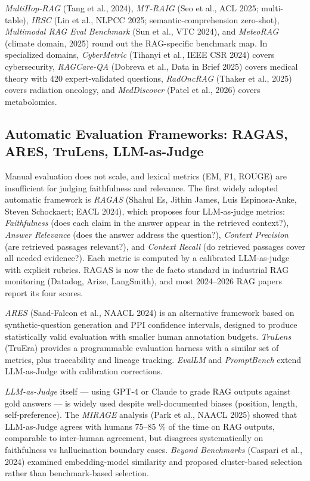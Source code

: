\emph{MultiHop-RAG} (Tang et al., 2024), \emph{MT-RAIG} (Seo et al., ACL 2025; multi-table), \emph{IRSC} (Lin et al., NLPCC 2025; semantic-comprehension zero-shot), \emph{Multimodal RAG Eval Benchmark} (Sun et al., VTC 2024), and \emph{MeteoRAG} (climate domain, 2025) round out the RAG-specific benchmark map. In specialized domains, \emph{CyberMetric} (Tihanyi et al., IEEE CSR 2024) covers cybersecurity, \emph{RAGCare-QA} (Dobreva et al., Data in Brief 2025) covers medical theory with 420 expert-validated questions, \emph{RadOncRAG} (Thaker et al., 2025) covers radiation oncology, and \emph{MedDiscover} (Patel et al., 2026) covers metabolomics.

\subsection{Automatic Evaluation Frameworks: RAGAS, ARES, TruLens, LLM-as-Judge}\label{automatic-evaluation-frameworks-ragas-ares-trulens-llm-as-judge}

Manual evaluation does not scale, and lexical metrics (EM, F1, ROUGE) are insufficient for judging faithfulness and relevance. The first widely adopted automatic framework is \emph{RAGAS} (Shahul Es, Jithin James, Luis Espinosa-Anke, Steven Schockaert; EACL 2024), which proposes four LLM-as-judge metrics: \emph{Faithfulness} (does each claim in the answer appear in the retrieved context?), \emph{Answer Relevance} (does the answer address the question?), \emph{Context Precision} (are retrieved passages relevant?), and \emph{Context Recall} (do retrieved passages cover all needed evidence?). Each metric is computed by a calibrated LLM-as-judge with explicit rubrics. RAGAS is now the de facto standard in industrial RAG monitoring (Datadog, Arize, LangSmith), and most 2024--2026 RAG papers report its four scores.

\emph{ARES} (Saad-Falcon et al., NAACL 2024) is an alternative framework based on synthetic-question generation and PPI confidence intervals, designed to produce statistically valid evaluation with smaller human annotation budgets. \emph{TruLens} (TruEra) provides a programmable evaluation harness with a similar set of metrics, plus traceability and lineage tracking. \emph{EvalLM} and \emph{PromptBench} extend LLM-as-Judge with calibration corrections.

\emph{LLM-as-Judge} itself --- using GPT-4 or Claude to grade RAG outputs against gold answers --- is widely used despite well-documented biases (position, length, self-preference). The \emph{MIRAGE} analysis (Park et al., NAACL 2025) showed that LLM-as-Judge agrees with humans 75--85 \% of the time on RAG outputs, comparable to inter-human agreement, but disagrees systematically on faithfulness vs hallucination boundary cases. \emph{Beyond Benchmarks} (Caspari et al., 2024) examined embedding-model similarity and proposed cluster-based selection rather than benchmark-based selection.

